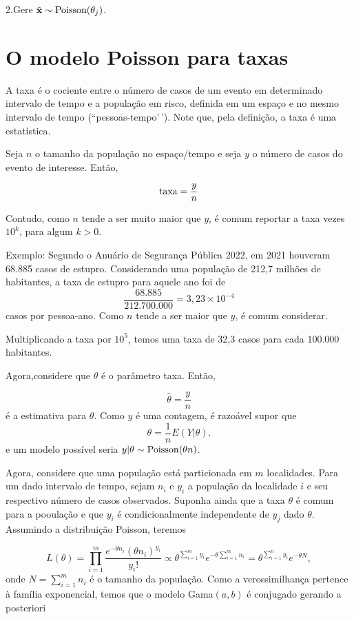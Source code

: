 \documentclass[
  letterpaper,
  DIV=11,
  numbers=noendperiod]{scrreprt}
\theoremstyle{definition}
\theoremstyle{definition}
\theoremstyle{remark}
\begin{document}
2.Gere \(\tilde{\mathbf{x}}\sim\hbox{Poisson}(\theta_j)\).

\hypertarget{o-modelo-poisson-para-taxas}{%
\section{O modelo Poisson para
taxas}\label{o-modelo-poisson-para-taxas}}

A taxa é o cociente entre o número de casos de um evento em determinado
intervalo de tempo e a população em risco, definida em um espaço e no
mesmo intervalo de tempo (``pessoas-tempo'\,'). Note que, pela
definição, a taxa é uma estatística.

Seja \(n\) o tamanho da população no espaço/tempo e seja \(y\) o número
de casos do evento de interesse. Então,

\[\hbox{taxa} = \frac{y}{n}\]

Contudo, como \(n\) tende a ser muito maior que \(y\), é comum reportar
a taxa vezes \(10^k\), para algum \(k>0\).

Exemplo: Segundo o Anuário de Segurança Pública 2022, em 2021 houveram
68.885 casos de estupro. Considerando uma população de 212,7 milhões de
habitantes, a taxa de estupro para aquele ano foi de
\[\frac{68.885}{212.700.000}=3,23\times 10^{-4}\] casos por pessoa-ano.
Como \(n\) tende a ser maior que \(y\), é comum considerar.

Multiplicando a taxa por \(10^5\), temos uma taxa de 32,3 casos para
cada 100.000 habitantes.

Agora,considere que \(\theta\) é o parâmetro taxa. Então,

\[\hat{\theta}=\frac{y}{n}\] é a estimativa para \(\theta\). Como \(y\)
é uma contagem, é razoável supor que \[\theta =\frac{1}{n}E(Y|\theta).\]
e um modelo possível seria \(y|\theta\sim\hbox{Poisson}(\theta n)\).

Agora, considere que uma população está particionada em \(m\)
localidades. Para um dado intervalo de tempo, sejam \(n_i\) e \(y_i\) a
população da localidade \(i\) e seu respectivo número de casos
observados. Suponha ainda que a taxa \(\theta\) é comum para a pooulação
e que \(y_i\) é condicionalmente independente de \(y_j\) dado
\(\theta\). Assumindo a distribuição Poisson, teremos

\[L(\theta)=\prod_{i=1}^m\frac{e^{-\theta n_i}(\theta n_i)^{y_i}}{y_i!}\varpropto \theta^{\sum_{i=1}^m y_i}e^{-\theta \sum_{i=1}^m n_i}=\theta^{\sum_{i=1}^n y_i}e^{-\theta N},\]
onde \(N=\sum_{i=1}^m n_i\) é o tamanho da população. Como a
verossimilhança pertence à família exponencial, temos que o modelo
Gama\((a,b)\) é conjugado gerando a posteriori
\end{document}
